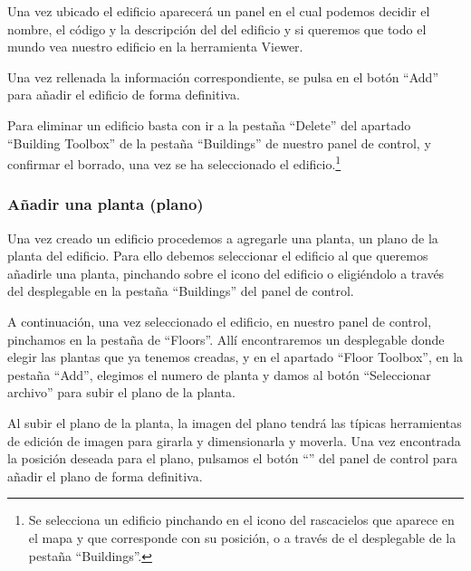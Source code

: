 
Una vez ubicado el edificio aparecerá un panel en el cual podemos decidir el nombre, el código y la descripción del del edificio y si queremos que todo el mundo vea nuestro edificio en la herramienta Viewer.

Una vez rellenada la información correspondiente, se pulsa en el botón ``Add'' para añadir el edificio de forma definitiva.


Para eliminar un edificio basta con ir a la pestaña ``Delete'' del apartado ``Building Toolbox'' de la pestaña ``Buildings'' de nuestro panel de control, y confirmar el borrado, una vez se ha seleccionado el edificio.\footnote{Se selecciona un edificio pinchando en el icono del rascacielos que aparece en el mapa y que corresponde con su posición, o a través de el desplegable de la pestaña ``Buildings''.}

\subsubsection{Añadir una planta (plano)}

Una vez creado un edificio procedemos a agregarle una planta, un plano de la planta del edificio. Para ello debemos seleccionar el edificio al que queremos añadirle una planta, pinchando sobre el icono del edificio o eligiéndolo a través del desplegable en la pestaña ``Buildings'' del panel de control.


A continuación, una vez seleccionado el edificio, en nuestro panel de control, pinchamos en la pestaña de ``Floors''. Allí encontraremos un desplegable donde elegir las plantas que ya tenemos creadas, y en el apartado ``Floor Toolbox'', en la pestaña ``Add'', elegimos el numero de planta y damos al botón ``Seleccionar archivo'' para subir el plano de la planta.

Al subir el plano de la planta, la imagen del plano tendrá las típicas herramientas de edición de imagen para girarla y dimensionarla y moverla. Una vez encontrada la posición deseada para el plano, pulsamos el botón ``\checkmark'' del panel de control para añadir el plano de forma definitiva.
\newpage
{}

